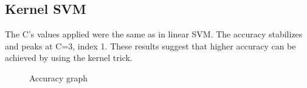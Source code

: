 \subsection{Kernel SVM}
The C's values applied were the same as in linear SVM. The accuracy stabilizes and peaks at C=3, index 1. These results suggest that higher accuracy can be achieved by using the kernel trick.   
\\
\par
\begin{figure}[H]
  \centering
  \hfill
  \hfill
   \caption{Accuracy graph}
\end{figure}
\newpage
